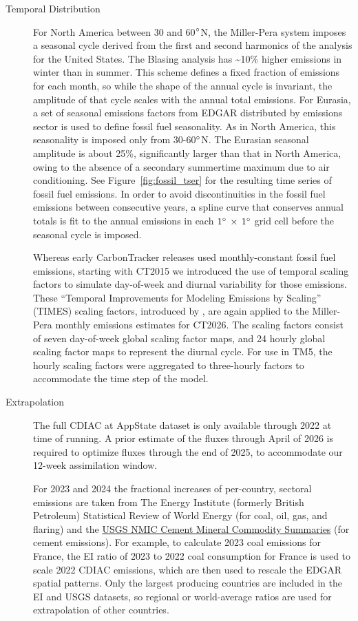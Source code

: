 \documentclass[11pt,openany]{book}
\newcommand\ctver{CT2026}
\begin{document}
\begin{description}
\item[Temporal Distribution] For North America between 30 and
  60$^{\circ}$N, the Miller-Pera system imposes a seasonal cycle derived
  from the first and second harmonics \citep{thoning89a} of the
  \citet{blasing04a} analysis for the United States. The Blasing
  analysis has \textasciitilde{}10\% higher emissions in winter than
  in summer.  This scheme defines a fixed fraction of emissions for
  each month, so while the shape of the annual cycle is invariant, the
  amplitude of that cycle scales with the annual total emissions. For
  Eurasia, a set of seasonal emissions factors from EDGAR distributed
  by emissions sector is used to define fossil fuel seasonality. As
  in North America, this seasonality is imposed only from
  30{-}60$^{\circ}$N. The Eurasian seasonal amplitude is about 25\%,
  significantly larger than that in North America, owing to the
  absence of a secondary summertime maximum due to air conditioning.
  See Figure~\ref{fig:fossil_tser} for the resulting time series
  of fossil fuel emissions. In order to avoid discontinuities in the
  fossil fuel emissions between consecutive years, a spline curve that
  conserves annual totals \citep{rasmussen91a} is fit to the annual
  emissions in each $1^{\circ}\,\times\,1^{\circ}$ grid cell before the seasonal cycle is
  imposed.

  Whereas early CarbonTracker releases used monthly-constant fossil fuel
emissions, starting with CT2015 we introduced the use of temporal
scaling factors to simulate day-of-week and diurnal variability for
those emissions.  These ``Temporal Improvements for Modeling Emissions
by Scaling'' (TIMES) scaling factors, introduced by \citet{nassar13a},
are again applied to the Miller-Pera monthly emissions estimates for
\ctver.  The scaling factors consist of seven day-of-week global
scaling factor maps, and 24 hourly global scaling factor maps to
represent the diurnal cycle.  For use in TM5, the hourly scaling
factors were aggregated to three-hourly factors to accommodate the
time step of the model.


\item[Extrapolation] The full CDIAC at AppState dataset is
  only available through 2022 at time of running. A prior
  estimate of the fluxes through April of 2026 is required to optimize
  fluxes through the end of 2025, to accommodate our 12-week
  assimilation window.

  For 2023 and 2024 the fractional increases of
  per-country, sectoral emissions are taken from The Energy Institute
  (formerly British Petroleum) Statistical Review of World Energy
  \citep{ei25a} (for coal, oil, gas, and flaring) and the
  \href{https://www.usgs.gov/centers/national-minerals-information-center/cement-statistics-and-information}{USGS
    NMIC Cement Mineral Commodity Summaries} (for cement emissions).
  For example, to calculate 2023 coal emissions for France, the
  EI ratio of 2023 to 2022 coal consumption for France is used to
  scale 2022 CDIAC emissions, which are then used to rescale the
  EDGAR spatial patterns. Only the largest producing countries are
  included in the EI and USGS datasets, so regional or world-average
  ratios are used for extrapolation of other countries.


\end{description}
\end{document}
